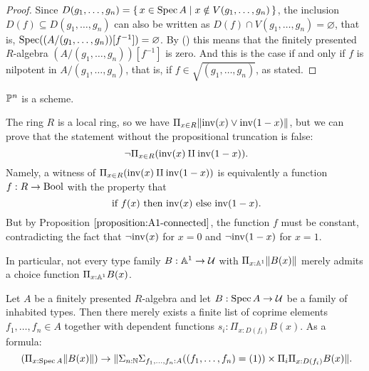 \documentclass{zariski}
\begin{document}
\begin{proof}
  Since $D(g_1, \dots, g_n) = \{\, x \in \operatorname{Spec} A \mid x \notin V(g_1, \dots, g_n) \,\}$,
  the inclusion $D(f) \subseteq D(g_1, \dots, g_n)$
  can also be written as
  $D(f) \cap V(g_1, \dots, g_n) = \varnothing$, that is,
  $\operatorname{Spec}((A/(g_1, \dots, g_n))[f^{-1}]) = \varnothing$.
  By ()
  this means that the finitely presented $R$-algebra $(A/(g_1, \dots, g_n))[f^{-1}]$
  is zero.
  And this is the case if and only if $f$ is nilpotent in $A/(g_1, \dots, g_n)$,
  that is, if $f \in \sqrt{(g_1, \dots, g_n)}$, as stated.
\end{proof}

\pagebreak

\begin{theorem}
  $\mathbb{P}^n$ is a scheme.
\end{theorem}


\begin{example}
  The ring $R$ is a local ring, so we have
  $\Pi_{x \in R} \lVert \mathrm{inv}(x) \lor \mathrm{inv}(1 - x) \rVert$,
  but we can prove that
  the statement without the propositional truncation is false:
  \[ \lnot \Pi_{x \in R} (\inv(x) \amalg \inv(1 - x)) \rlap{.} \]
  Namely,
  a witness of $\Pi_{x \in R} (\mathrm{inv}(x) \amalg \mathrm{inv}(1 - x))$
  is equivalently a function $f : R \to \mathrm{Bool}$
  with the property that
  \[ \text{if $f(x)$ then $\inv(x)$ else $\inv(1 - x)$} \rlap{.} \]
  But by Proposition $\ref{proposition:A1-connected}$,
  the function $f$ must be constant,
  contradicting the fact that
  $\lnot\mathrm{inv}(x)$ for $x = 0$ and $\lnot\mathrm{inv}(1 - x)$ for $x = 1$.

  In particular,
  not every type family $B : \mathbb{A}^1 \to \mathcal{U}$ with $\Pi_{x : \mathbb{A}^1} \lVert B(x) \rVert$
  merely admits a choice function $\Pi_{x : \mathbb{A}^1} B(x)$.
\end{example}

\begin{axiom}[Z-choice]%
  \label{Z-choice}
  Let $A$ be a finitely presented $R$-algebra
  and let $B : \operatorname{Spec} A \to \mathcal{U}$ be a family of inhabited types.
  Then there merely exists
  a finite list of coprime elements $f_1, \dots, f_n \in A$
  together with dependent functions $s_i : \Pi_{x : D(f_i)} B(x)$.
  As a formula:
  \[ (\Pi_{x : \Spec A} \propTrunc{B(x)}) \to
     \propTrunc{ \Sigma_{n : \N} \Sigma_{f_1, \dots, f_n : A}
      ((f_1, \dots, f_n) = (1)) \times
      \Pi_i \Pi_{x : D(f_i)} B(x) }
     \rlap{.}
  \]
\end{axiom}
\end{document}
